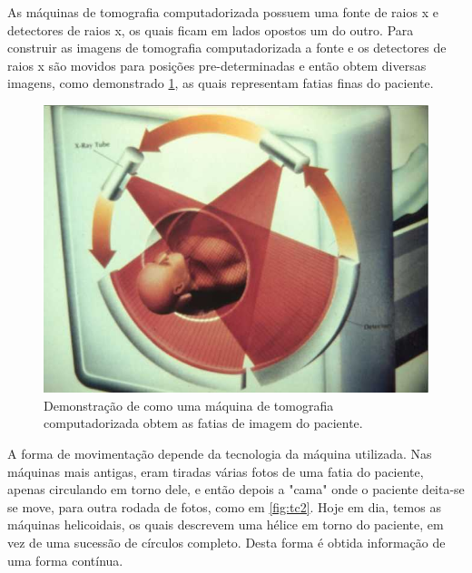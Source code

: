 As máquinas de tomografia computadorizada possuem uma fonte de raios x e detectores de raios x, os quais ficam em lados opostos um do outro. Para construir as imagens de tomografia computadorizada a fonte e os detectores de raios x são movidos para posições pre-determinadas e então obtem diversas imagens, como demonstrado \ref{fig:tc1}, as quais representam fatias finas do paciente.

\begin{figure}[ht]
 \begin{center}
  \includegraphics{imagens/tc.jpg}
 \end{center}
 \caption{Demonstração de como uma máquina de tomografia computadorizada obtem as fatias de imagem do paciente.}
 \label{fig:tc1}
\end{figure}

A forma de movimentação depende da tecnologia da máquina utilizada. Nas máquinas mais antigas, eram tiradas várias fotos de uma fatia do paciente, apenas circulando em torno dele, e então depois a "cama" onde o paciente deita-se se move, para outra rodada de fotos, como em \ref{fig:tc2}. Hoje em dia, temos as máquinas helicoidais, os quais descrevem uma hélice em torno do paciente, em vez de uma sucessão de círculos completo. Desta forma é obtida informação de uma forma contínua.


